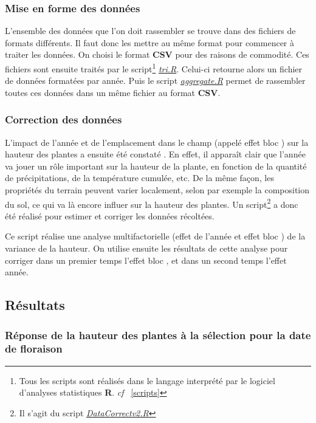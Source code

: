 \documentclass[12pt,a4paper]{article}
\begin{document}
			\subsubsection{Mise en forme des données}
				
				L'ensemble des données que l'on doit rassembler se trouve dans des fichiers de formats différents. Il faut donc les mettre au même format pour commencer à traiter les données. On choisi le format \textbf{CSV} pour des raisons de commodité. Ces fichiers sont ensuite traités par le script\footnote{Tous les scripts sont réalisés dans le langage interprété par le logiciel d'analyses statistiques \textbf{R}. \textit{cf} ~\ref{scripts}} \textit{\ul{tri.R}}. Celui-ci retourne alors un fichier de données formatées par année. Puis le script \textit{\ul{aggregate.R}} permet de rassembler toutes ces données dans un même fichier au format \textbf{CSV}.
			
			\subsubsection{Correction des données}
				
				L'impact de l'année et de l'emplacement dans le champ (appelé \og effet bloc \fg) sur la hauteur des plantes a ensuite été constaté . En effet, il apparaît clair que l'année va jouer un rôle important sur la hauteur de la plante, en fonction de la quantité de précipitations, de la température cumulée, etc. De la même façon, les propriétés du terrain peuvent varier localement, selon par exemple la composition du sol, ce qui va là encore influer sur la hauteur des plantes. Un script\footnote{Il s'agit du script \textit{\ul{DataCorrectv2.R}}} a donc été réalisé pour estimer et corriger les données récoltées.
				
				Ce script réalise une analyse multifactorielle (effet de l'année et \og effet bloc \fg) de la variance de la hauteur. On utilise ensuite les résultats de cette analyse pour corriger dans un premier temps l'\og effet bloc \fg, et dans un second temps l'effet année.
				
		\subsection{Résultats}
			
			\subsubsection{Réponse de la hauteur des plantes à la sélection pour la date de floraison}
			
\end{document}
